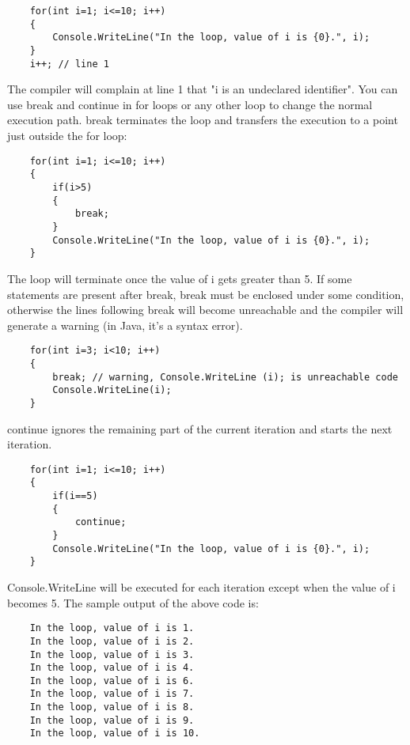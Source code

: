 \begin{lstlisting}
    for(int i=1; i<=10; i++)
    {
        Console.WriteLine("In the loop, value of i is {0}.", i);
    }
    i++; // line 1    
\end{lstlisting}

The compiler will complain at line 1 that "i is an undeclared identifier".
You can use break and continue in for loops or any other loop to change the normal execution path. break
terminates the loop and transfers the execution to a point just outside the for loop:

\begin{lstlisting}
    for(int i=1; i<=10; i++)
    {
        if(i>5)
        {
            break;
        }
        Console.WriteLine("In the loop, value of i is {0}.", i);
    }    
\end{lstlisting}

The loop will terminate once the value of i gets greater than 5. If some statements are present after break, break
must be enclosed under some condition, otherwise the lines following break will become unreachable and the
compiler will generate a warning (in Java, it’s a syntax error).

\begin{lstlisting}
    for(int i=3; i<10; i++)
    {
        break; // warning, Console.WriteLine (i); is unreachable code
        Console.WriteLine(i);
    }    
\end{lstlisting}

continue ignores the remaining part of the current iteration and starts the next iteration.

\begin{lstlisting}
    for(int i=1; i<=10; i++)
    {
        if(i==5)
        {
            continue;
        }
        Console.WriteLine("In the loop, value of i is {0}.", i);
    }    
\end{lstlisting}


Console.WriteLine will be executed for each iteration except when the value of i becomes 5. The sample output of
the above code is:

\begin{lstlisting}
    In the loop, value of i is 1.
    In the loop, value of i is 2.
    In the loop, value of i is 3.
    In the loop, value of i is 4.
    In the loop, value of i is 6.
    In the loop, value of i is 7.
    In the loop, value of i is 8.
    In the loop, value of i is 9.        
    In the loop, value of i is 10.
\end{lstlisting}


